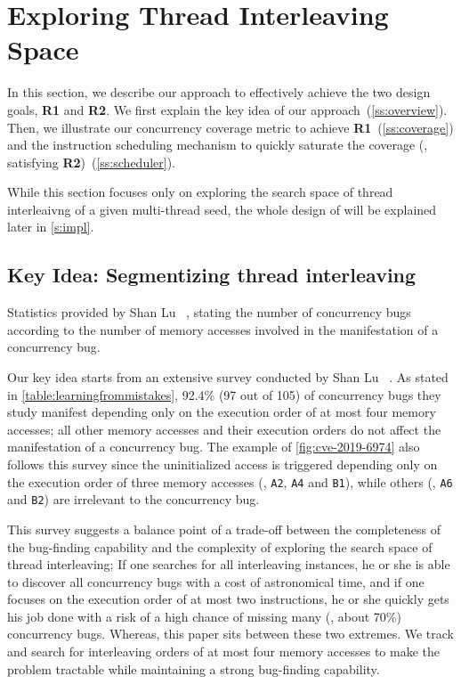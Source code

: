 \section{Exploring Thread Interleaving Space}
\label{s:design}

In this section, we describe our approach to effectively achieve the
two design goals, \textbf{R1} and \textbf{R2}.
%
We first explain the key idea of our
approach~(\autoref{ss:overview}). Then, we illustrate our concurrency
coverage metric to achieve \textbf{R1}~(\autoref{ss:coverage}) and the
instruction scheduling mechanism to quickly saturate the
coverage (\eg, satisfying \textbf{R2})~(\autoref{ss:scheduler}).


While this section focuses only on exploring the search space of
thread interleaivng of a given multi-thread seed, the whole design of
\sys will be explained later in \autoref{s:impl}.


\subsection{Key Idea: Segmentizing thread interleaving}
\label{ss:overview}


\begin{table}[t]
  \centering
  
  \caption{Statistics provided by Shan Lu
    \etal~\cite{learningfrommistakes}, stating the number of
    concurrency bugs according to the number of memory accesses
    involved in the manifestation of a concurrency bug.}
  \label{table:learningfrommistakes}
\end{table}

Our key idea starts from an extensive survey conducted by Shan Lu
\etal~\cite{learningfrommistakes}.
%
As stated in \autoref{table:learningfrommistakes}, 92.4\% (97 out of
105) of concurrency bugs they study manifest depending only on the
execution order of at most four memory accesses; all other memory
accesses and their execution orders do not affect the manifestation of
a concurrency bug.
%
The example of \autoref{fig:cve-2019-6974} also follows this survey
since the uninitialized access is triggered depending only on the
execution order of three memory accesses (\eg, \texttt{A2},
\texttt{A4} and \texttt{B1}), while others (\eg, \texttt{A6} and
\texttt{B2}) are irrelevant to the concurrency bug.


This survey suggests a balance point of a trade-off between the
completeness of the bug-finding capability and the complexity of
exploring the search space of thread interleaving;
%
If one searches for all interleaving instances, he or she is able to
discover all concurrency bugs with a cost of astronomical time, and
if one focuses on the execution order of at most two instructions, he
or she quickly gets his job done with a risk of a high chance of
missing many (\eg, about 70\%) concurrency bugs.
%
Whereas, this paper sits between these two extremes. We track and
search for interleaving orders of at most four memory accesses to make
the problem tractable while maintaining a strong bug-finding
capability.



